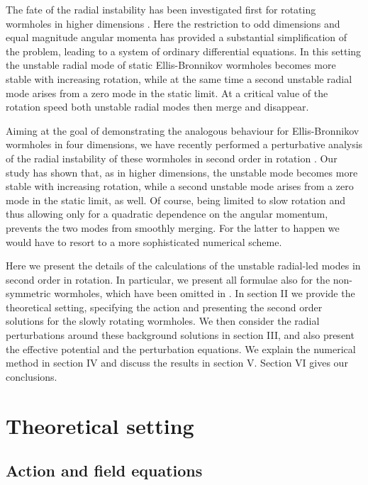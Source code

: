 \documentclass[aps,prd,12pt,superscriptaddress]{revtex4-2}
\begin{document}
The fate of the radial instability has been investigated first for rotating wormholes in higher dimensions \cite{Dzhunushaliev:2013jja}.
Here the restriction to odd dimensions and equal magnitude angular momenta has provided a substantial simplification of the problem, leading to a system of ordinary differential equations. 
In this setting the unstable radial mode of static Ellis-Bronnikov wormholes becomes more stable with increasing rotation, while at the same time a second unstable radial mode arises from a zero mode in the static limit.
At a critical value of the rotation speed both unstable radial modes then merge and disappear.

Aiming at the goal of demonstrating the analogous behaviour for Ellis-Bronnikov wormholes in four dimensions, we have recently performed a perturbative analysis of the radial instability of these wormholes in second order in rotation \cite{Azad:2023iju}.
Our study has shown that, as in higher dimensions, the unstable mode becomes more stable with increasing rotation, while a second unstable mode arises from a zero mode in the static limit, as well.
Of course, being limited to slow rotation and thus allowing only for a quadratic dependence on the angular momentum, prevents the two modes from smoothly merging.
For the latter to happen we would have to resort to a more sophisticated numerical scheme.

Here we present the details of the calculations of the unstable radial-led modes in second order in rotation.
In particular, we present all formulae also for the non-symmetric wormholes, which have been omitted in \cite{Azad:2023iju}.
In section II we provide the theoretical setting, specifying the action and presenting the second order solutions for the slowly rotating wormholes.
We then consider the radial perturbations around these background solutions in section III, and also present the effective potential and the perturbation equations.
We explain the numerical method in section IV and discuss the results in section V. 
Section VI gives our conclusions.


\section{Theoretical setting}

\subsection{Action and field equations}
\end{document}
